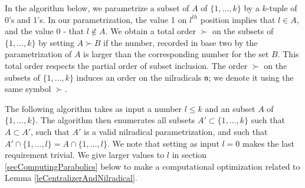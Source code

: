 \documentclass[12pt]{report}
\newcommand{\kk}{\mathfrak{k}}
\newcommand{\nn}{\mathfrak{n}}
\newcommand{\gG}{\mathfrak{g}}
\begin{document}
In the algorithm below, we parametrize a subset of $A$ of $\{1,\dots,k\}$ by a $k$-tuple of 0's and 1's. In our parametrization, the value 1 on $l^{th}$ position implies that $l\in A$, and the value 0 - that $l\notin A$. %
We obtain a total order $\succ$ on the subsets of $\{1,\dots,k\}$ by setting $A\succ B$ if the number, recorded in base two by the parametrization of $A$ is larger than the corresponding number for the set $B$. This total order respects the partial order of subset inclusion. The order $\succ$ on the subsets of $\{1,\dots, k\}$ induces an order on the nilradicals $\nn$; we denote it using the same symbol $\succ$. 

The following algorithm takes as input a number $l\leq k$ and an subset $A$ of $\{1,\dots,k\}$. The algorithm then enumerates all subsets $A'\subset \{1,\dots,k\}$ such that $A\subset A'$, such that $A'$ is a valid nilradical parametrization, and such that $A'\cap \{1,\dots,l\}=A\cap\{1,\dots,l\}$. We note that setting as input $l=0$ makes the last requirement trivial. We give larger values to $l$ in section \ref{secComputingParabolics} below to make a computational optimization related to Lemma \ref{leCentralizerAndNilradical}. 
\end{document}
